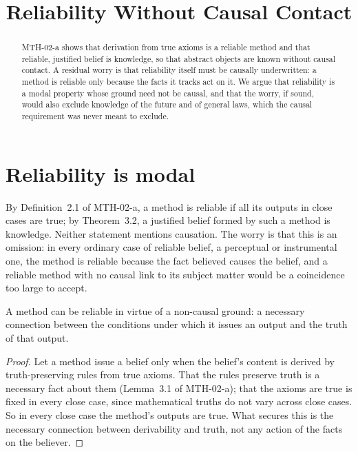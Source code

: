 \documentclass{situationist-preprint}
\title{Reliability Without Causal Contact}
\begin{document}
\maketitle

\begin{abstract}
MTH-02-a shows that derivation from true axioms is a reliable method and that reliable, justified belief is knowledge, so that abstract objects are known without causal contact. A residual worry is that reliability itself must be causally underwritten: a method is reliable only because the facts it tracks act on it. We argue that reliability is a modal property whose ground need not be causal, and that the worry, if sound, would also exclude knowledge of the future and of general laws, which the causal requirement was never meant to exclude.
\end{abstract}

\section{Reliability is modal}\label{s:modal}

By Definition~2.1 of MTH-02-a, a method is reliable if all its outputs in close cases are true; by Theorem~3.2, a justified belief formed by such a method is knowledge. Neither statement mentions causation. The worry is that this is an omission: in every ordinary case of reliable belief, a perceptual or instrumental one, the method is reliable because the fact believed causes the belief, and a reliable method with no causal link to its subject matter would be a coincidence too large to accept.

\begin{proposition}\label{p:ground}
A method can be reliable in virtue of a non-causal ground: a necessary connection between the conditions under which it issues an output and the truth of that output.
\end{proposition}

\begin{proof}
Let a method issue a belief only when the belief's content is derived by truth-preserving rules from true axioms. That the rules preserve truth is a necessary fact about them (Lemma~3.1 of MTH-02-a); that the axioms are true is fixed in every close case, since mathematical truths do not vary across close cases. So in every close case the method's outputs are true. What secures this is the necessary connection between derivability and truth, not any action of the facts on the believer.
\end{proof}
\end{document}
